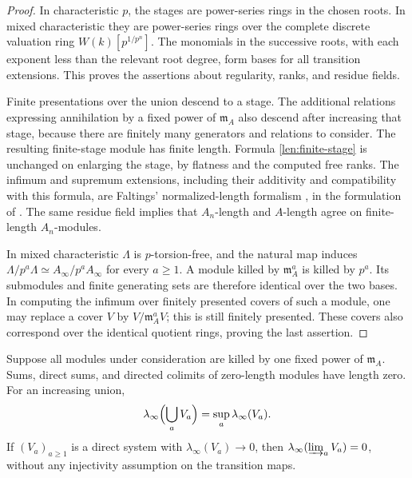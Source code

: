 \begin{proof}
In characteristic $p$, the stages are power-series rings in the chosen
roots.  In mixed characteristic they are power-series rings over the
complete discrete valuation ring $W(k)[p^{1/p^n}]$.
The monomials in the successive roots, with each exponent less than
the relevant root degree, form bases for all transition extensions.
This proves the assertions about regularity, ranks, and residue fields.

Finite presentations over the union descend to a stage.  The additional
relations expressing annihilation by a fixed power of
$\mathfrak m_A$ also descend after increasing that stage, because
there are finitely many generators and relations to consider.  The
resulting finite-stage module has finite length.  Formula
\eqref{len:finite-stage} is unchanged on enlarging the stage, by
flatness and the computed free ranks.  The infimum and supremum
extensions, including their additivity and compatibility with this
formula, are Faltings' normalized-length formalism
\cite[Appendix~2]{Faltings}, in the formulation of
\cite[Definition~2.2.1 and Propositions~2.2.3, 2.2.6(a)]{CLMST}.
The same residue field implies that $A_n$-length and $A$-length
agree on finite-length $A_n$-modules.

In mixed characteristic $\Lambda$ is $p$-torsion-free, and the natural
map induces $\Lambda/p^a\Lambda\simeq A_\infty/p^aA_\infty$ for every
$a\geq1$.  A module killed by $\mathfrak m_A^a$ is killed by $p^a$.
Its submodules and finite generating sets are therefore identical
over the two bases.  In computing the infimum over finitely presented
covers of such a module, one may replace a cover $V$ by
$V/\mathfrak m_A^aV$; this is still finitely presented.  These covers
also correspond over the identical quotient rings, proving the last
assertion.
\end{proof}

\begin{lemma}\label{len:zero-length-limits}
Suppose all modules under consideration are killed by one fixed power
of $\mathfrak m_A$.  Sums, direct sums, and directed colimits of
zero-length modules have length zero.  For an increasing union,
\[
 \lambda_\infty\Bigl(\bigcup_a V_a\Bigr)
                         =\sup_a\lambda_\infty(V_a).
\]
If $(V_a)_{a\geq1}$ is a direct system with
$\lambda_\infty(V_a)\to0$, then
$\lambda_\infty(\varinjlim_a V_a)=0$, without any injectivity
assumption on the transition maps.
\end{lemma}

